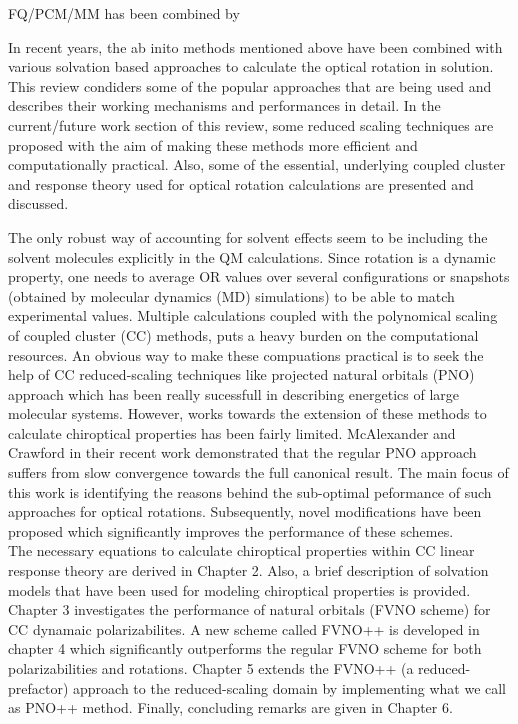 FQ/PCM/MM has been combined by

In recent years, the ab inito methods
mentioned above have been combined with various solvation based
approaches\cite{Neugebauer05,Neugebauer09,Mennucci02,Tomasi05,JensenGordon96}
to calculate the optical rotation in solution. This review condiders some of
the popular approaches that are being used and describes their working
mechanisms and performances in detail. In the current/future work section of
this review, some reduced scaling techniques are proposed with the aim of
making these methods more efficient and computationally practical. Also, some
of the essential, underlying coupled cluster and response theory used for
optical rotation calculations are presented and discussed.







The only robust way of accounting for solvent effects seem to be including the solvent molecules explicitly 
in the QM calculations. Since rotation is a dynamic property, one needs to average OR values over several 
configurations or snapshots (obtained by molecular dynamics (MD) simulations) to be able to match experimental 
values. Multiple calculations coupled with the polynomical scaling of coupled cluster (CC) methods, puts a heavy burden 
on the computational resources. An obvious way to make these compuations practical is to seek the help of CC reduced-scaling 
techniques like projected natural orbitals (PNO) approach\cite{} which has been really sucessfull in describing energetics of 
large molecular systems. However, works towards the extension of these methods to calculate chiroptical properties has been 
fairly limited\cite{}. McAlexander and Crawford in their recent work\cite{} demonstrated that the regular PNO approach
suffers from slow convergence towards the full canonical result. The main focus of this work is identifying the reasons
behind the sub-optimal peformance of such approaches for optical rotations. Subsequently, novel modifications
have been proposed which significantly improves the performance of these schemes.\\
The necessary equations to calculate chiroptical properties within CC linear response theory are derived in 
Chapter 2. Also, a brief description of solvation models that have been used for modeling chiroptical properties 
is provided. Chapter 3 investigates the performance of natural orbitals (FVNO scheme) for CC dynamaic  polarizabilites.
A new scheme called FVNO++ is developed in chapter 4 which significantly outperforms the regular FVNO scheme
for both polarizabilities and rotations. Chapter 5 extends the FVNO++ (a reduced-prefactor) approach to the reduced-scaling 
domain by implementing what we call as PNO++ method. Finally, concluding remarks are given in Chapter 6.

